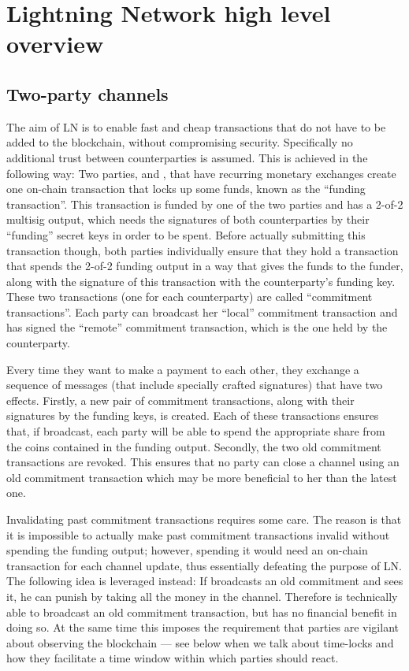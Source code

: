 \section{Lightning Network high level overview}
  \subsection{Two-party  channels}
    The aim of LN is to enable fast and cheap transactions that do not have to
    be added to the blockchain, without compromising security. Specifically no
    additional trust between counterparties is assumed. This is achieved in the
    following way: Two parties, \alice{} and \bob, that have recurring monetary
    exchanges create one on-chain transaction that locks up some funds, known as
    the ``funding transaction''. This transaction is funded by one of the two
    parties and has a 2-of-2 multisig output, which needs the signatures of both
    counterparties by their ``funding'' secret keys in order to be spent.
    Before actually submitting this transaction though, both parties
    individually ensure that they hold a transaction that spends the 2-of-2
    funding output in a way that gives the funds to the funder, along with the
    signature of this transaction with the counterparty's funding key. These two
    transactions (one for each counterparty) are called ``commitment
    transactions''. Each party can broadcast her ``local'' commitment
    transaction and has signed the ``remote'' commitment transaction, which is
    the one held by the counterparty.

    Every time they want to make a payment to each other, they exchange a
    sequence of messages (that include specially crafted signatures) that have
    two effects.  Firstly, a new pair of commitment transactions, along with
    their signatures by the funding keys, is created. Each of these transactions
    ensures that, if broadcast, each party will be able to spend the appropriate 
    share from the coins contained in the funding output.  Secondly, the two old
    commitment transactions are revoked.  This ensures that no party can close a
    channel using an old commitment transaction which may be
    more beneficial to her than the latest one.

    Invalidating past commitment transactions requires some care. The reason is that
    it is impossible to actually make past commitment transactions
    invalid without spending the funding output; however, spending it would need an
    on-chain transaction for each channel 
    update, thus essentially defeating the purpose of LN. The
    following idea is leveraged instead: If \alice{} broadcasts an old
    commitment and \bob{} sees it, he can punish \alice{} by taking all the
    money in the channel. Therefore \alice{} is technically able to broadcast an
    old commitment transaction, but has no financial benefit in doing so. 
    At the same time this imposes the requirement that parties are vigilant about
    observing the blockchain --- see below when we talk about time-locks and how 
    they facilitate a  time window within which  parties should react.
    
